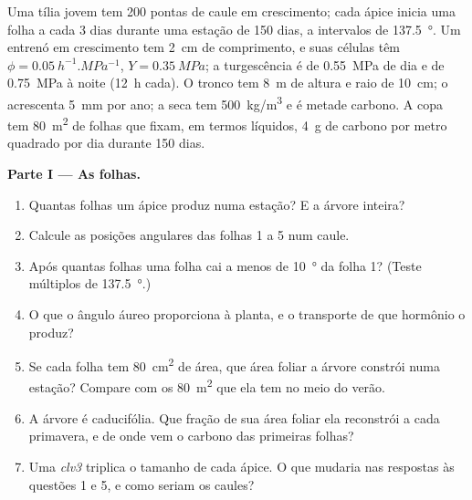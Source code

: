 \begin{problem}
\label{pb:b2:plant-meristems:1}
Uma tília jovem tem \num{200} pontas de caule em crescimento; cada
ápice inicia uma folha a cada \num{3} dias durante uma estação de
\num{150} dias, a intervalos de \qty{137.5}{\degree}. Um entrenó em
crescimento tem \qty{2}{cm} de comprimento, e suas células têm
$\phi = \qty{0.05}{h^{-1}.MPa^{-1}}$, $Y =
\qty{0.35}{MPa}$; a turgescência é de \qty{0.55}{MPa} de dia e de
\qty{0.75}{MPa} à noite (\qty{12}{h} cada). O tronco tem \qty{8}{m} de
altura e raio de \qty{10}{cm}; o  acrescenta \qty{5}{mm} por ano;
a  seca tem \qty{500}{kg/m^3} e é metade carbono. A copa tem
\qty{80}{m^2} de folhas que fixam, em termos líquidos, \qty{4}{g} de
carbono por metro quadrado por dia durante \num{150} dias.

\medskip
\noindent\textbf{Parte I --- As folhas.}
\begin{enumerate}
  \item Quantas folhas um ápice produz numa estação? E a árvore
        inteira?
  \item Calcule as posições angulares das folhas 1 a 5 num caule.
  \item Após quantas folhas uma folha cai a menos de
        \qty{10}{\degree} da folha 1? (Teste múltiplos de
        \qty{137.5}{\degree}.)
  \item O que o ângulo áureo proporciona à planta, e o transporte de
        que hormônio o produz?
  \item Se cada folha tem \qty{80}{cm^2} de área, que área foliar a
        árvore constrói numa estação? Compare com os \qty{80}{m^2} que
        ela tem no meio do verão.
  \item A árvore é caducifólia. Que fração de sua área foliar ela
        reconstrói a cada primavera, e de onde vem o carbono das
        primeiras folhas?
  \item Uma  \emph{clv3} triplica o tamanho de cada ápice. O que
        mudaria nas respostas às questões 1 e 5, e como seriam os
        caules?
\end{enumerate}


\end{problem}
